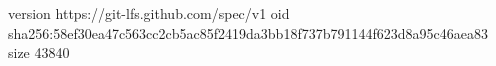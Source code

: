 version https://git-lfs.github.com/spec/v1
oid sha256:58ef30ea47c563cc2cb5ac85f2419da3bb18f737b791144f623d8a95c46aea83
size 43840

